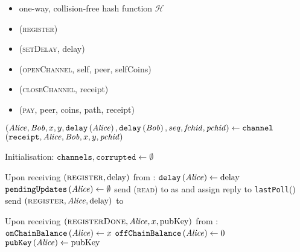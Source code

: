 \begin{functionality}{\fpaynet}
  \label{alg:payfunc}
    \begin{itemize}
      \item one-way, collision-free hash function $\mathcal{H}$
    \end{itemize}

    \begin{itemize}
      \item (\textsc{register})
      \item (\textsc{setDelay}, delay)
      \item (\textsc{openChannel}, self, peer, selfCoins)
      \item (\textsc{closeChannel}, receipt)
      \item (\textsc{pay}, peer, coins, path, receipt)
    \end{itemize}

  \begin{algorithmic}[1]
      \State $\left(\mathit{Alice}, \mathit{Bob}, x, y, \mathtt{delay}\left(\mathit{Alice}\right),
      \mathtt{delay}\left(\mathit{Bob}\right), seq, \mathit{fchid},
      \mathit{pchid}\right) \gets \mathtt{channel}$
      \State \Return $\left(\mathtt{receipt}, \mathit{Alice}, \mathit{Bob}, x, y,
      \mathit{pchid}\right)$
    \EndFunction
    \State

    \State Initialisation:
    \Indent
      \State $\mathtt{channels}, \mathtt{corrupted} \gets \emptyset$
    \EndIndent
    \State

    \State Upon receiving $\left(\textsc{register}, \mathrm{delay}\right)$ from
    \alice:
    \Indent
      \State $\mathtt{delay}\left(\mathit{Alice}\right) \gets \mathrm{delay}$
      \State $\mathtt{pendingUpdates}\left(\mathit{Alice}\right) \gets \emptyset$
      \State send (\textsc{read}) to \clock{} as \alice{} and assign reply to
      \texttt{lastPoll}(\alice)
      \State send $\left(\textsc{register}, \mathit{Alice}, \mathrm{delay}\right)$ to
      \simulator
    \EndIndent
    \State

    \State Upon receiving $\left(\textsc{registerDone}, \mathit{Alice}, x,
    \mathrm{pubKey}\right)$ from \simulator: 
    \Indent
      \State $\mathtt{onChainBalance}\left(\mathit{Alice}\right) \gets x$
      \State $\mathtt{offChainBalance}\left(\mathit{Alice}\right) \gets 0$
      \State $\mathtt{pubKey}\left(\mathit{Alice}\right) \gets \mathrm{pubKey}$
    \EndIndent
    \State


\end{algorithmic}
\end{functionality}

